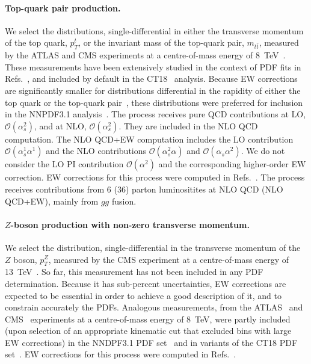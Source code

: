 \paragraph{Top-quark pair production.}
We select the distributions, single-differential in either the transverse
momentum of the top quark, $p_T^t$, or the invariant mass of the top-quark
pair, $m_{t\bar t}$, measured by the ATLAS and CMS experiments at a centre-of-mass
energy of 8~TeV~\cite{Aad:2015mbv,Khachatryan:2015oqa}. These measurements have
been extensively studied in the context of PDF fits in
Refs.~\cite{Czakon:2016olj,Bailey:2019yze,Amoroso:2020lgh,Kadir:2020yml}, and
included by default in the CT18~\cite{Hou:2019efy} analysis.
Because EW corrections are significantly smaller for distributions differential
in the rapidity of either the top quark or the top-quark
pair~\cite{Czakon:2017wor}, these distributions were preferred for inclusion
in the NNPDF3.1 analysis~\cite{Ball:2017nwa}. The process receives 
pure QCD contributions at LO, $\mathcal{O}(\alpha_s^2)$, and
at NLO, $\mathcal{O}(\alpha_s^2)$. They are included in the NLO QCD
computation. The NLO QCD+EW computation includes the LO contribution
$\mathcal{O}(\alpha_s^1\alpha^1)$ and the NLO contributions
$\mathcal{O}(\alpha_s^2\alpha)$ and $\mathcal{O}(\alpha_s\alpha^2)$.
We do not consider the LO PI contribution $\mathcal{O}(\alpha^2)$ and the
corresponding higher-order EW correction. EW corrections for this process
were computed in Refs.~\cite{Bernreuther:2010ny,Hollik:2011ps,Kuhn:2011ri,Bernreuther:2012sx,Pagani:2016caq,Czakon:2017wor,Czakon:2017lgo,Czakon:2017mmr,Czakon:2019bcq,Czakon:2019txp}. The process receives contributions from
6 (36) parton luminositites at NLO QCD (NLO QCD+EW), mainly from $gg$ fusion.

\paragraph{$Z$-boson production with non-zero transverse momentum.}
We select the distribution, single-differential in the transverse momentum of
the $Z$ boson, $p_T^Z$, measured by the CMS experiment at a centre-of-mass
energy of 13~TeV~\cite{Sirunyan:2019bzr}. So far, this measurement has not been
included in any PDF determination. Because it has sub-percent uncertainties,
EW corrections are expected to be essential in order to achieve a good
description of it, and to constrain accurately the PDFs. Analogous measurements,
from the ATLAS~\cite{Aad:2015auj} and CMS~\cite{Khachatryan:2015oaa}
experiments at a centre-of-mass energy of 8~TeV, were partly included (upon
selection of an appropriate kinematic cut that excluded bins with large EW
corrections) in the NNDPF3.1 PDF set~\cite{Ball:2017nwa} and in variants of
the CT18 PDF set~\cite{Hou:2019efy}. EW corrections for this process
were computed in Refs.~\cite{Kuhn:2005az,Denner:2011vu,Hollik:2015pja,Kallweit:2015dum}.

